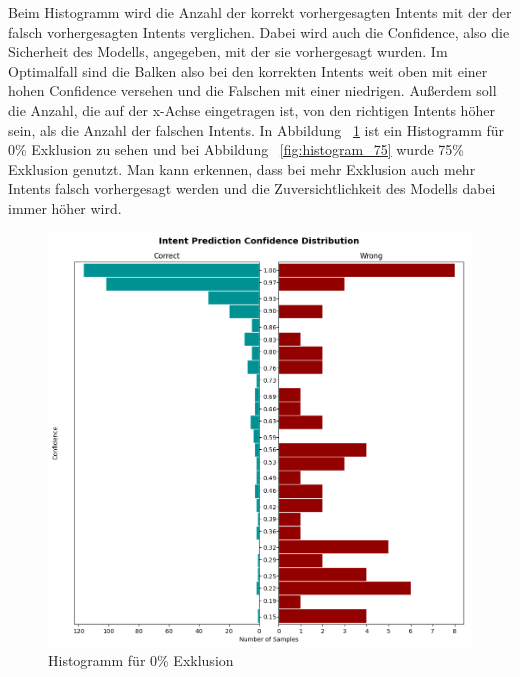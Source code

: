 Beim Histogramm wird die Anzahl der korrekt vorhergesagten Intents mit der der falsch vorhergesagten Intents verglichen.
Dabei wird auch die Confidence, also die Sicherheit des Modells, angegeben, mit der sie vorhergesagt wurden.
Im Optimalfall sind die Balken also bei den korrekten Intents weit oben mit einer hohen Confidence versehen und die Falschen mit einer niedrigen.
Außerdem soll die Anzahl, die auf der x-Achse eingetragen ist, von den richtigen Intents höher sein, als die Anzahl der falschen Intents.
In Abbildung ~\ref{fig:histogram_0} ist ein Histogramm für 0\% Exklusion zu sehen und bei Abbildung ~\ref{fig:histogram_75} wurde 75\% Exklusion genutzt.
Man kann erkennen, dass bei mehr Exklusion auch mehr Intents falsch vorhergesagt werden und die Zuversichtlichkeit des Modells dabei immer höher wird.

\begin{figure}[hbt!]
    \centering
    \includegraphics[scale=0.5]{pics/intent_histogram_0}
    \caption{Histogramm für 0\% Exklusion}
    \label{fig:histogram_0}
\end{figure}


